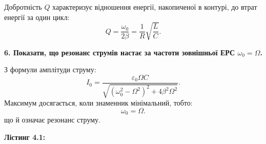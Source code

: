 \documentclass[12pt, a4paper]{article}
\begin{document}
    Добротність \( Q \) характеризує відношення енергії, накопиченої в контурі, до втрат енергії за один цикл:
    \[
    Q = \frac{\omega_0}{2\beta} = \frac{1}{R} \sqrt{\frac{L}{C}}.
    \]

    \vspace{1em}

    \textbf{6. Показати, що резонанс струмів настає за частоти зовнішньої ЕРС \( \omega_0 = \Omega \).}

    З формули амплітуди струму:
    \[
    I_0 = \frac{\varepsilon_0 \Omega C}{\sqrt{(\omega_0^2 - \Omega^2)^2 + 4\beta^2 \Omega^2}}.
    \]
    Максимум досягається, коли знаменник мінімальний, тобто:
    \[
    \omega_0 = \Omega.
    \]
    що й означає резонанс струму.

    \newpage

    \hypertarget{listing1}{}

    \textbf{\large Лістинг 4.1:}

    \vspace{1em}
\end{document}
